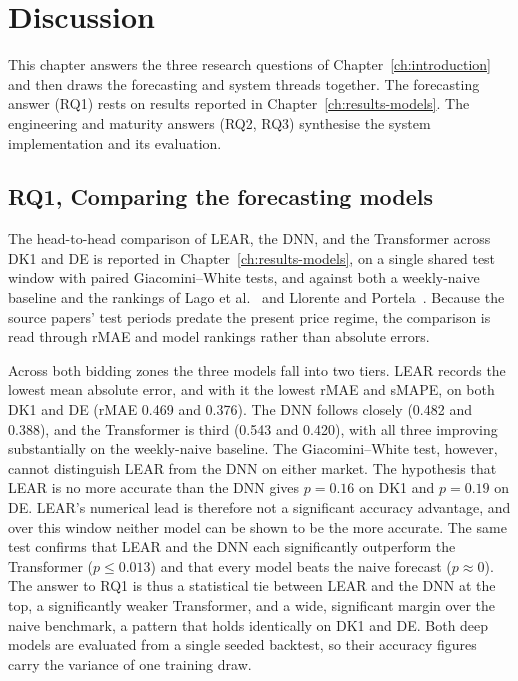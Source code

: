 \chapter{Discussion}
\label{ch:discussion}

This chapter answers the three research questions of Chapter~\ref{ch:introduction} and
then draws the forecasting and system threads together. The forecasting answer
(RQ1) rests on results reported in Chapter~\ref{ch:results-models}. The
engineering and maturity answers (RQ2, RQ3) synthesise the system implementation
and its evaluation.

\section{RQ1, Comparing the forecasting models}

The head-to-head comparison of LEAR, the DNN, and the Transformer across DK1 and
DE is reported in Chapter~\ref{ch:results-models}, on a single shared test window
with paired Giacomini--White tests, and against both a
weekly-naive baseline and the rankings of Lago et al.~\cite{lago2021} and
Llorente and Portela~\cite{llorente2025transformer}. Because the source papers'
test periods predate the present price regime, the comparison is read through
rMAE and model rankings rather than absolute errors.

Across both bidding zones the three models fall into two tiers. LEAR records
the lowest mean absolute error, and with it the lowest rMAE and sMAPE, on
both DK1 and DE (rMAE 0.469 and 0.376). The DNN follows closely (0.482 and
0.388), and the Transformer is third (0.543 and 0.420), with all three improving
substantially on the weekly-naive baseline. The Giacomini--White test, however,
cannot distinguish LEAR from the DNN on either market. The hypothesis that LEAR
is no more accurate than the DNN gives $p=0.16$ on DK1 and $p=0.19$ on DE.
LEAR's numerical lead is therefore not a
significant accuracy advantage, and over this window neither model can be shown
to be the more accurate. The same test confirms that LEAR and the DNN each significantly
outperform the Transformer ($p\le0.013$) and that every model beats the naive
forecast ($p\approx0$). The answer to RQ1 is thus a statistical tie between
LEAR and the DNN at the top, a significantly weaker Transformer, and a wide,
significant margin over the naive benchmark, a pattern that holds identically
on DK1 and DE. Both deep models are evaluated from a single seeded backtest, so
their accuracy figures carry the variance of one training draw.

